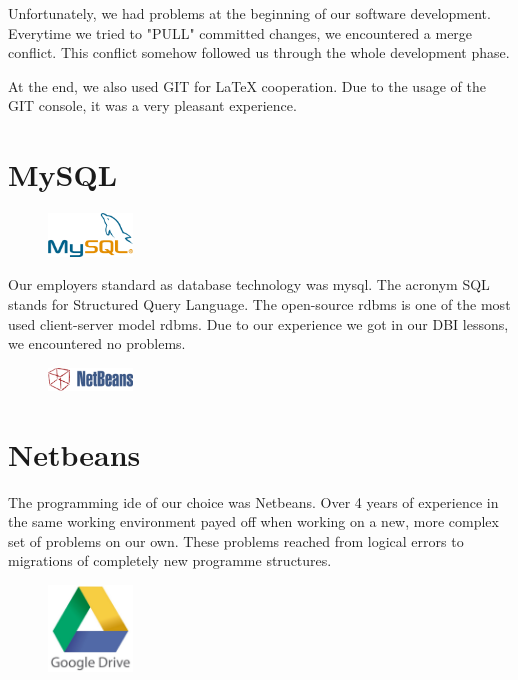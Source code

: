 Unfortunately, we had problems at the beginning of our software development. Everytime we tried to "PULL" committed changes, we encountered a merge conflict. This conflict somehow followed us through the whole development phase.

At the end, we also used GIT for LaTeX cooperation. Due to the usage of the GIT console, it was a very pleasant experience.
\section{MySQL}
\begin{figure}
  \begin{center}
    \includegraphics[width=0.2\textwidth] {bilder/MySQL}
  \end{center}
\end{figure}
Our employers standard as database technology was \gls{mysql}. The acronym SQL stands for Structured Query Language. The open-source \gls{rdbms} is one of the most used client-server model \gls{rdbms}. Due to our experience we got in our DBI lessons, we encountered no problems.

\begin{figure}
  \begin{center}
    \includegraphics[width=0.2\textwidth] {bilder/NetBeans}
  \end{center}
\end{figure}
\section{Netbeans}
The programming \gls{ide} of our choice was Netbeans. Over 4 years of experience in the same working environment payed off when working on a new, more complex set of problems on our own. These problems reached from logical errors to migrations of completely new programme structures. 
\begin{figure}
  \begin{center}
    \includegraphics[width=0.2\textwidth] {bilder/googledrive}
  \end{center}
\end{figure}
